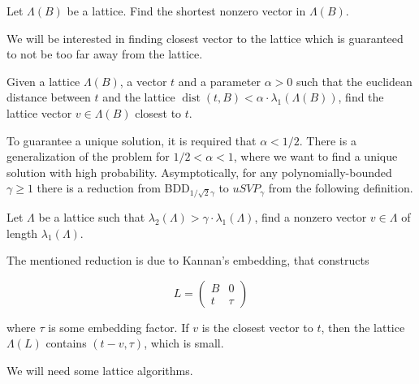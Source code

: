 \begin{definition}
    Let $\Lambda(B)$ be a lattice. Find the shortest nonzero vector in $\Lambda(B)$.
\end{definition}

We will be interested in finding closest vector to the lattice which is guaranteed to not be too far away from the lattice.

\begin{definition}
    Given a lattice $\Lambda(B)$, a vector $t$ and a parameter $ \alpha > 0$ such that the euclidean distance between $t$ and the lattice $\operatorname*{dist}(t,B) < \alpha \cdot \lambda_1(\Lambda(B))$, find the lattice vector $v \in \Lambda(B)$ closest to $t$.
\end{definition}

To guarantee a unique solution, it is required that $\alpha < 1/2$. There is a generalization of the problem for $1/2 < \alpha < 1$, where we want to find a unique solution with high probability. Asymptotically, for any polynomially-bounded $\gamma \geq 1$ there is a reduction from BDD$_{1/\sqrt{2}\gamma}$ to $uSVP_\gamma$ from the following definition.

\begin{definition}
    Let $\Lambda$ be a lattice such that $\lambda_2(\Lambda) > \gamma \cdot \lambda_1(\Lambda)$, find a nonzero vector $v \in \Lambda$ of length $\lambda_1(\Lambda)$.
\end{definition}

The mentioned reduction is due to Kannan's embedding, that constructs

\begin{equation*}
    L = \begin{pmatrix} 
        B & 0 \\ 
        t & \tau 
        \end{pmatrix}
\end{equation*}

where $\tau$ is some embedding factor. If $v$ is the closest vector to $t$, then the lattice $\Lambda(L)$ contains $(t - v, \tau)$, which is small.

We will need some lattice algorithms.

